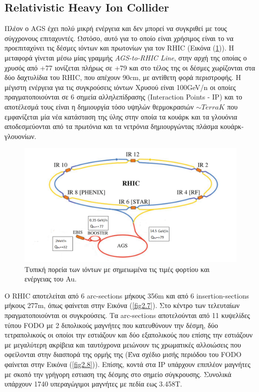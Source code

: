 \subsection{Relativistic Heavy Ion Collider}

Πλέον ο AGS έχει πολύ μικρή ενέργεια και δεν μπορεί να συγκριθεί με τους σύγχρονους επιταχυντές. Ωστόσο, αυτό για το οποίο είναι χρήσιμος είναι το να προεπιταχύνει τις δέσμες ιόντων και πρωτονίων για τον RHIC (Εικόνα (\ref{fig2.6})). Η μεταφορά γίνεται μέσω μίας γραμμής \textit{AGS-to-RHIC Line}, στην αρχή της οποίας ο χρυσός από +77 ιονίζεται πλήρως σε +79 και στο τέλος της οι δέσμες χωρίζονται στα δύο δαχτυλίδια του RHIC, που απέχουν 90cm, με αντίθετη φορά περιστροφής.
	Η μέγιστη ενέργεια για τις συγκρούσεις ιόντων Χρυσού είναι 100GeV/n οι οποίες πραγματοποιούνται σε 6 σημεία αλληλεπίδρασης (Interaction Points - IP) και το αποτέλεσμά τους είναι η δημιουργία τόσο υψηλών θερμοκρασιών $\sim TerraK$ που εμφανίζεται μία νέα κατάσταση της ύλης στην οποία τα κουάρκ και τα γλουόνια αποδεσμεύονται από τα πρωτόνια και τα νετρόνια δημιουργώντας πλάσμα κουάρκ-γλουονίων.
	
	\begin{figure}[h!]
		\centering
		\includegraphics[scale=0.5]{Accelerating_System/RHIC_full.png}
		\caption{Τυπική πορεία των ιόντων με σημειωμένα τις τιμές φορτίου και ενέργειας του Au. }
		\label{fig2.6}
	\end{figure}
		
	
	Ο RHIC αποτελείται από 6 arc-sections μήκους 356m και από 6 insertion-sections μήκους 277m, όπως φαίνεται στην Εικόνα (\ref{fig2.7}). Στο κέντρο των τελευταίων πραγματοποιούνται οι συγκρούσεις. Τα arc-sections αποτελούνται από 11 κυψελίδες τύπου FODO με 2 διπολικούς μαγνήτες που κατευθύνουν την δέσμη, δύο τετραπολικούς οι οποίοι την εστιάζουν και δύο εξαπολικούς που επίσης την εστιάζουν με μεγαλύτερη ακρίβεια και ταυτόχρονα μειώνουν τις χρωματικές αλλοιώσεις που οφείλονται στην διασπορά της ορμής της (Ένα σχέδιο μισής περιόδου του FODO φαίνεται στην Εικόνα (\ref{fig2.8})). Επίσης, κοντά στα IP υπάρχουν επιπλέον μαγνήτες με σκοπό την γρήγορη εστιαση της δέσμης στο σημείο σύγκρουσης.	
	Συνολικά υπάρχουν 1740 υπεραγώγιμοι μαγνήτες με πεδία εως 3.458Τ.
	
